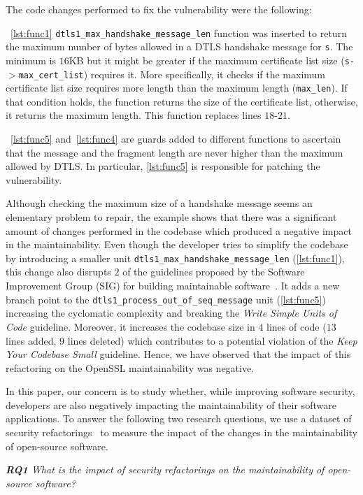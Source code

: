 \documentclass[10pt,conference]{IEEEtran}
\begin{document}
The code changes performed to fix the vulnerability were the following:

~\ref{lst:func1} \texttt{dtls1\_max\_handshake\_message\_len} function was
inserted to return the maximum number of bytes allowed in a DTLS
handshake message for \texttt{s}. The minimum is $16$KB but it might be greater if
the maximum certificate list size (\texttt{s-$>$max\_cert\_list}) requires it. More
specifically, it checks if the maximum certificate list size requires more length than the maximum length
(\texttt{max\_len}). If that condition holds, the function returns the size of
the certificate list, otherwise, it returns the maximum length. This function
replaces lines $18$-$21$.


~\ref{lst:func5} and~\ref{lst:func4} are guards added to different functions to
ascertain that the message and the fragment length are never higher than the
maximum allowed by DTLS. In particular, \ref{lst:func5} is responsible for patching
the vulnerability.

Although checking the maximum size of a handshake message seems an elementary
problem to repair, the example shows that there was a significant amount of
changes performed in the codebase which produced a negative impact in the
maintainability. Even though the developer tries to simplify the
codebase by introducing a smaller unit
\texttt{dtls1\_max\_handshake\_message\_len} (\ref{lst:func1}), this change also
disrupts $2$ of the guidelines proposed by the Software Improvement Group (SIG) for
building maintainable software~\cite{Visser:2016:OREILLY}. It adds a new branch
point to the \texttt{dtls1\_process\_out\_of\_seq\_message} unit
(\ref{lst:func5}) increasing the cyclomatic complexity and breaking the
\emph{Write Simple Units of Code} guideline. Moreover, it increases the codebase
size in $4$ lines of code ($13$ lines added, $9$ lines deleted) which
contributes to a potential violation of the \emph{Keep Your Codebase Small}
guideline. Hence, we have observed that the impact of this refactoring on the
OpenSSL maintainability was negative.

In this paper, our concern is to study whether, while improving software
security, developers are also negatively impacting the maintainability of their
software applications. To answer the following two research questions, we use a
dataset of security refactorings~\cite{Reis:2017:IJSSE} to measure the impact of
the changes in the maintainability of open-source software.

\begin{framed}
\textit{\textbf{RQ1} What is the impact of security refactorings on the
maintainability of open-source software?}
\end{framed}
\end{document}
